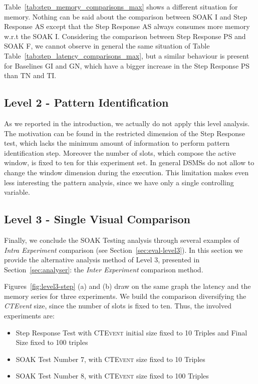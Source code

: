 Table~\ref{tab:step_memory_comparisons_max} shows a different situation for memory. Nothing can be said about the comparison between SOAK I and Step Response AS except that the Step Response AS always consumes more memory w.r.t the SOAK I. Considering the comparison between Step Response PS and SOAK F, we cannot observe in general the same situation of Table Table~\ref{tab:step_latency_comparisons_max}, but a similar behaviour is present for Baselines GI and GN, which have a bigger increase in the Step Response PS than TN and TI.





\subsection{Level 2 - Pattern Identification}\label{sec:level2-step-pattern}

As we reported in the introduction, we actually do not apply this level analysis. The motivation can be found in the restricted dimension of the Step Response test, which lacks the minimum amount of information to perform pattern identification step. Moreover the number of slots, which compose the active window, is fixed to ten for this experiment set. In general DSMSs do not allow to change the window dimension during the execution. This limitation makes even less interesting the pattern analysis, since we have only a single controlling variable.

\subsection{Level 3 - Single Visual Comparison}\label{sec:level3-step-inter}

Finally, we conclude the SOAK Testing analysis through several examples of \textit{Intra Experiment} comparison (see Section~\ref{sec:eval-level3}). In this section we provide the alternative analysis method of Level 3, presented in Section~\ref{sec:analyser}: the \textit{Inter Experiment} comparison method.

Figures~\ref{fig:level3-step} (a) and (b) draw on the same graph the latency and the memory series for three experiments.  We build the comparison diversifying the \textit{CTEvent} size, since the number of slots is fixed to ten. Thus, the involved experiments are:
\begin{itemize}
\item Step Response Test with \textsc{CTEvent} initial size fixed to 10 Triples and Final Size fixed to 100 triples
\item SOAK Test Number 7, with \textsc{CTEvent} size fixed to 10 Triples
\item SOAK Test Number 8, with \textsc{CTEvent} size fixed to 100 Triples
\end{itemize}

